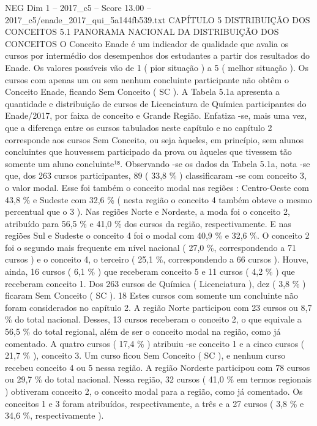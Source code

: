 \begin{textsample}{NEG Dim 1 – 2017\_c5 – Score 13.00 – 2017\_c5/enade\_2017\_qui\_5a144fb539.txt}  \label{ex:f1_neg_387}
CAPÍTULO 5 DISTRIBUIÇÃO DOS CONCEITOS 5.1 PANORAMA NACIONAL DA DISTRIBUIÇÃO DOS CONCEITOS O Conceito Enade é um indicador de qualidade que avalia os cursos por intermédio dos desempenhos dos estudantes a partir dos resultados do Enade.
Os valores possíveis vão de 1 ( pior situação ) a 5 ( melhor situação ).
Os cursos com apenas um ou sem nenhum concluinte participante não obtêm o Conceito Enade, ficando Sem Conceito ( SC ).
A Tabela 5.1a apresenta a quantidade e distribuição de cursos de Licenciatura de Química participantes do Enade/2017, por faixa de conceito e Grande Região.
Enfatiza -se, mais uma vez, que a diferença entre os cursos tabulados neste capítulo e no capítulo 2 corresponde aos cursos Sem Conceito, ou seja àqueles, em princípio, sem alunos concluintes que houvessem participado da prova ou àqueles que tivessem tão somente um aluno concluinte¹⁸.
Observando -se os dados da Tabela 5.1a, nota -se que, dos 263 cursos participantes, 89 ( 33,8 \% ) classificaram -se com conceito 3, o valor modal.
Esse foi também o conceito modal nas regiões : Centro-Oeste com 43,8 \% e Sudeste com 32,6 \% ( nesta região o conceito 4 também obteve o mesmo percentual que o 3 ).
Nas regiões Norte e Nordeste, a moda foi o conceito 2, atribuído para 56,5 \% e 41,0 \% dos cursos da região, respectivamente.
E nas regiões Sul e Sudeste o conceito 4 foi o modal com 40,9 \% e 32,6 \%.
O conceito 2 foi o segundo mais frequente em nível nacional ( 27,0 \%, correspondendo a 71 cursos ) e o conceito 4, o terceiro ( 25,1 \%, correspondendo a 66 cursos ).
Houve, ainda, 16 cursos ( 6,1 \% ) que receberam conceito 5 e 11 cursos ( 4,2 \% ) que receberam conceito 1.
Dos 263 cursos de Química ( Licenciatura ), dez ( 3,8 \% ) ficaram Sem Conceito ( SC ). 18 Estes cursos com somente um concluinte não foram considerados no capítulo 2.
A região Norte participou com 23 cursos ou 8,7 \% do total nacional.
Desses, 13 cursos receberam o conceito 2, o que equivale a 56,5 \% do total regional, além de ser o conceito modal na região, como já comentado.
A quatro cursos ( 17,4 \% ) atribuiu -se conceito 1 e a cinco cursos ( 21,7 \% ), conceito 3.
Um curso ficou Sem Conceito ( SC ), e nenhum curso recebeu conceito 4 ou 5 nessa região.
A região Nordeste participou com 78 cursos ou 29,7 \% do total nacional.
Nessa região, 32 cursos ( 41,0 \% em termos regionais ) obtiveram conceito 2, o conceito modal para a região, como já comentado.
Os conceitos 1 e 3 foram atribuídos, respectivamente, a três e a 27 cursos ( 3,8 \% e 34,6 \%, respectivamente ).

\end{textsample}
